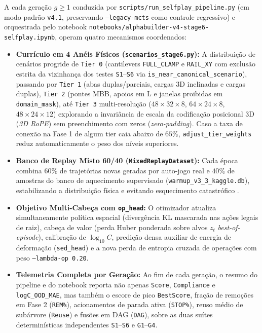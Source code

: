 \documentclass[11pt,a4paper]{article}
\begin{document}
A cada geração $g \ge 1$ conduzida por \texttt{scripts/run\_selfplay\_pipeline.py} (em modo padrão \texttt{v4.1}, preservando \texttt{--legacy-mcts} como controle regressivo) e orquestrada pelo notebook \texttt{notebooks/alphabuilder-v4-stage6-selfplay.ipynb}, operam quatro mecanismos coordenados:

\begin{itemize}
  \item \textbf{Currículo em 4 Anéis Físicos (\texttt{scenarios\_stage6.py}):} A distribuição de cenários progride de \texttt{Tier 0} (cantilevers \texttt{FULL\_CLAMP} e \texttt{RAIL\_XY} com exclusão estrita da vizinhança dos testes \texttt{S1}--\texttt{S6} via \texttt{is\_near\_canonical\_scenario}), passando por \texttt{Tier 1} (abas duplas/parciais, cargas 3D inclinadas e cargas duplas), \texttt{Tier 2} (pontes MBB, apoios em L e janelas proibidas em \texttt{domain\_mask}), até \texttt{Tier 3} multi-resolução ($48\times 32\times 8$, $64\times 24\times 8$, $48\times 24\times 12$) explorando a invariância de escala da codificação posicional 3D (\textit{3D RoPE}) sem preenchimento com zeros (\textit{zero-padding}). Caso a taxa de conexão na Fase 1 de algum tier caia abaixo de $65\%$, \texttt{adjust\_tier\_weights} reduz automaticamente o peso dos níveis superiores.
  \item \textbf{Banco de Replay Misto 60/40 (\texttt{MixedReplayDataset}):} Cada época combina $60\%$ de trajetórias novas geradas por auto-jogo real e $40\%$ de amostras do banco de aquecimento supervisado (\texttt{warmup\_v3\_3\_kaggle.db}), estabilizando a distribuição física e evitando esquecimento catastrófico \cite{woldseth2022use, nakamoto2023calql}.
  \item \textbf{Objetivo Multi-Cabeça com \texttt{op\_head}:} O otimizador atualiza simultaneamente política espacial (divergência KL mascarada nas ações legais de raiz), cabeça de valor (perda Huber ponderada sobre alvos $z_t$ \textit{best-of-episode}), calibração de $\log_{10} C$, predição densa auxiliar de energia de deformação (\texttt{sed\_head}) e a nova perda de entropia cruzada de operações com peso \texttt{--lambda-op 0.20}.
  \item \textbf{Telemetria Completa por Geração:} Ao fim de cada geração, o resumo do pipeline e do notebook reporta não apenas \texttt{Score}, \texttt{Compliance} e \texttt{logC\_OOD\_MAE}, mas também o escore de pico \texttt{BestScore}, fração de remoções em Fase 2 (\texttt{REM\%}), acionamentos de parada ativa (\texttt{STOP\%}), reuso médio de subárvore (\texttt{Reuse}) e fusões em DAG (\texttt{DAG}), sobre as duas suítes determinísticas independentes \texttt{S1}--\texttt{S6} e \texttt{G1}--\texttt{G4}.
\end{itemize}
\end{document}
